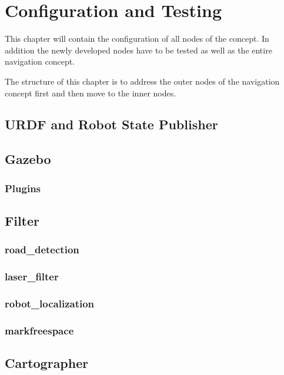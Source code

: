 \chapter{Configuration and Testing}
\label{configurationandtesting}
This chapter will contain the configuration of all nodes of the concept. In addition the newly developed nodes have to be tested as well as the entire navigation concept.


The structure of this chapter is to address the outer nodes of the navigation concept first and then move to the inner nodes.\\


\section{URDF and Robot State Publisher}

\section{Gazebo}

\subsection{Plugins}

\section{Filter}

\subsection{road\_detection}

\subsection{laser\_filter}

\subsection{robot\_localization}

\subsection{markfreespace}

\section{Cartographer}

